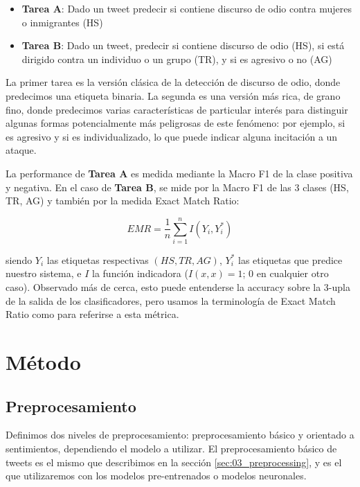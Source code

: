\newcommand{\subtaska}[0]{\textbf{Tarea A}}
\newcommand{\subtaskb}[0]{\textbf{Tarea B}}

\begin{itemize}
    \item \subtaska{}: Dado un tweet predecir si contiene discurso de odio contra mujeres o inmigrantes (HS)
    \item \subtaskb{}: Dado un tweet, predecir si contiene discurso de odio (HS), si está dirigido contra un individuo o un grupo (TR), y si es agresivo o no (AG)
\end{itemize}


La primer tarea es la versión clásica de la detección de discurso de odio, donde predecimos una etiqueta binaria. La segunda es una versión más rica, de grano fino, donde predecimos varias características de particular interés para distinguir algunas formas potencialmente más peligrosas de este fenómeno: por ejemplo, si es agresivo y si es individualizado, lo que puede indicar alguna incitación a un ataque.

La performance de \subtaska{} es medida mediante la Macro F1 de la clase positiva y negativa. En el caso de \subtaskb{}, se mide por la Macro F1 de las 3 clases (HS, TR, AG) y también por la medida Exact Match Ratio:

\begin{equation*}
    EMR = \frac{1}{n} \sum\limits_{i=1}^{n} I(Y_i, Y_i^*)
\end{equation*}

siendo $Y_i$ las etiquetas respectivas $(HS, TR, AG)$, $Y_i^*$ las etiquetas que predice nuestro sistema, e  $I$ la función indicadora ($I(x, x) = 1$; $0$ en cualquier otro caso). Observado más de cerca, esto puede entenderse la accuracy sobre la 3-upla de la salida de los clasificadores, pero usamos la terminología de Exact Match Ratio como \citet{zhang-2014-multilabel} para referirse a esta métrica.

\section{Método}

\subsection{Preprocesamiento}
\label{sec:04_preprocessing}

Definimos dos niveles de preprocesamiento: preprocesamiento básico y orientado a sentimientos, dependiendo el modelo a utilizar. El preprocesamiento básico de tweets es el mismo que describimos en la sección \ref{sec:03_preprocessing}, y es el que utilizaremos con los modelos pre-entrenados o modelos neuronales.


